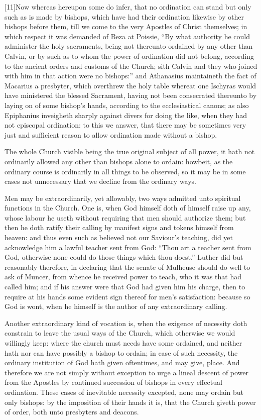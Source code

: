 [11]Now whereas hereupon some do infer, that no ordination can stand but only such as is made by bishops, which have had their ordination likewise by other bishops before them, till we come to the very Apostles of Christ themselves; in which respect it was demanded of Beza at Poissie, “By what authority he could administer the holy sacraments, being not thereunto ordained by any other than Calvin, or by such as to whom the power of ordination did not belong, according to the ancient orders and customs of the Church; sith Calvin and they who joined with him in that action were no bishops:” and Athanasius maintaineth the fact of Macarius a presbyter, which overthrew the holy table  whereat one Ischyras would have ministered the blessed Sacrament, having not been consecrated thereunto by laying on of some bishop’s hands, according to the ecclesiastical canons; as also Epiphanius inveigheth sharply against divers for doing the like, when they had not episcopal ordination: to this we answer, that there may be sometimes very just and sufficient reason to allow ordination made without a bishop.

The whole Church visible being the true original subject of all power, it hath not ordinarily allowed any other than bishops alone to ordain: howbeit, as the ordinary course is ordinarily in all things to be observed, so it may be in some cases not unnecessary that we decline from the ordinary ways.

Men may be extraordinarily, yet allowably, two ways admitted unto spiritual functions in the Church. One is, when God himself doth of himself raise up any, whose labour he useth without requiring that men should authorize them; but then he doth ratify their calling by manifest signs and tokens himself from heaven: and thus even such as believed not our Saviour’s teaching, did yet acknowledge him a lawful teacher sent from God: “Thou art a teacher sent from God, otherwise none could do those things which thou doest.” Luther did but reasonably therefore, in declaring that the senate of Mulheuse should do well to ask of Muncer, from whence he received power to teach, who it was that had called him; and if his answer were that God had given him his charge, then to require at his hands some evident sign thereof for men’s satisfaction: because so God is wont, when he himself is the author of any extraordinary calling.

Another extraordinary kind of vocation is, when the exigence of necessity doth constrain to leave the usual ways of the Church, which otherwise we would willingly keep: where  the church must needs have some ordained, and neither hath nor can have possibly a bishop to ordain; in case of such necessity, the ordinary institution of God hath given oftentimes, and may give, place. And therefore we are not simply without exception to urge a lineal descent of power from the Apostles by continued succession of bishops in every effectual ordination. These cases of inevitable necessity excepted, none may ordain but only bishops: by the imposition of their hands it is, that the Church giveth power of order, both unto presbyters and deacons.

